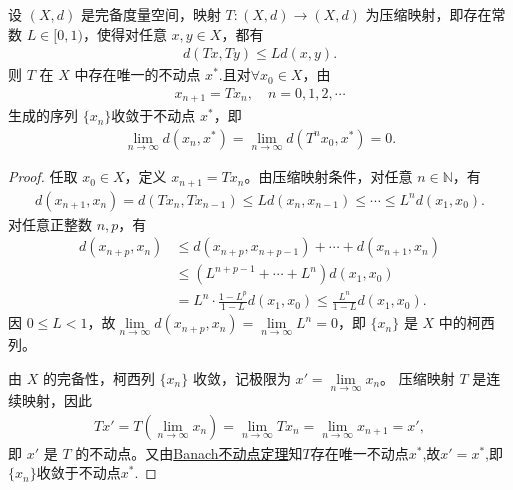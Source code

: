 \documentclass[../../main.tex]{subfiles}%
\begin{document}
\begin{corollary}\label{corollary:压缩映射迭代收敛性质}
设 $(X, d)$ 是完备度量空间，映射 $T: (X,d) \to (X,d)$ 为压缩映射，即存在常数 $L \in [0, 1)$，使得对任意 $x, y \in X$，都有
\begin{align*}
d(Tx, Ty) \leqslant L d(x, y).
\end{align*}
则 $T$ 在 $X$ 中存在唯一的不动点 $x^*$.且对$\forall x_0 \in X$，由
\begin{align*}
x_{n+1} = Tx_n,\quad n=0,1,2,\cdots
\end{align*}
生成的序列 $\{x_n\}$收敛于不动点 $x^*$，即
\begin{align*}
\lim_{n \to \infty} d(x_n, x^*) =\lim_{n \to \infty} d(T^nx_0, x^*) =0.
\end{align*}
\end{corollary}
\begin{proof}
任取 $x_0 \in X$，定义 $x_{n+1}=Tx_n$。由压缩映射条件，对任意 $n \in \mathbb{N}$，有
\begin{align*}
d(x_{n+1}, x_n) = d(Tx_n, Tx_{n-1}) \leqslant L d(x_n, x_{n-1}) \leqslant \cdots \leqslant L^n d(x_1, x_0).
\end{align*}
对任意正整数 $n, p$，有
\begin{align*}
d(x_{n+p}, x_n) &\leqslant d(x_{n+p}, x_{n+p-1}) + \cdots + d(x_{n+1}, x_n) \\
&\leqslant \left(L^{n+p-1} + \cdots + L^n\right) d(x_1, x_0) \\
&= L^n \cdot \frac{1-L^p}{1-L} d(x_1, x_0) \leqslant \frac{L^n}{1-L} d(x_1, x_0).
\end{align*}
因 $0 \leqslant L < 1$，故$\lim\limits_{n \to \infty}d(x_{n+p}, x_n)=\lim\limits_{n \to \infty} L^n = 0$，即 $\{x_n\}$ 是 $X$ 中的柯西列。

由 $X$ 的完备性，柯西列 $\{x_n\}$ 收敛，记极限为 $x' = \lim\limits_{n \to \infty} x_n$。
压缩映射 $T$ 是连续映射，因此
\begin{align*}
Tx' = T\left(\lim_{n \to \infty} x_n\right) = \lim_{n \to \infty} Tx_n = \lim_{n \to \infty} x_{n+1} = x',
\end{align*}
即 $x'$ 是 $T$ 的不动点。又由\hyperref[theorem:Banach不动点定理——压缩映象原理]{Banach不动点定理}知$T$存在唯一不动点$x^*$,故$x'=x^*$,即$\{x_n\}$收敛于不动点$x^*$.
\end{proof}
\end{document}
